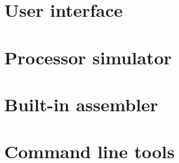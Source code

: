 \documentclass[a4paper,twosided, 15pt]{book}
\begin{document}
    \chapter{User interface}
        

    \chapter{Processor simulator}
        

    \chapter{Built-in assembler}
        

    \chapter{Command line tools}
        

    \printindex
    \listoftables
\end{document}
